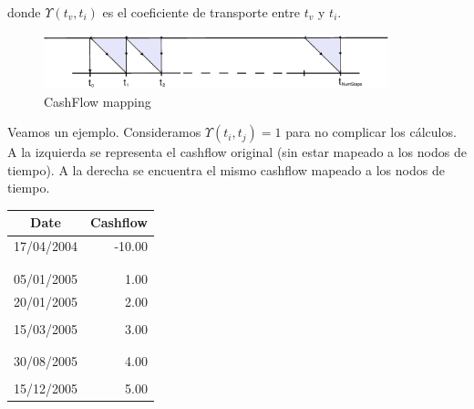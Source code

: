 donde $\Upsilon(t_v,t_i)$ es el coeficiente de transporte entre $t_v$ y $t_i$.

\begin{figure}[!hb]
\begin{center}
\includegraphics[width=10cm,angle=0]{./images/cashflowmapping.eps}
\caption{CashFlow mapping}
\label{timetranches}
\end{center}
\end{figure}

Veamos un ejemplo. Consideramos $\Upsilon(t_i,t_j)=1$ para no complicar los c\'alculos.
A la izquierda se representa el cashflow original (sin estar mapeado a los nodos de
tiempo). A la derecha se encuentra el mismo cashflow mapeado a los nodos de tiempo.
\newline
\newline
\begin{minipage}[c]{0.5\columnwidth}%
\centering
\begin{tabular}{c|r}
\textbf{Date} & \textbf{Cashflow} \\
\hline
17/04/2004 & -10.00 \\
           &        \\
           &        \\
05/01/2005 &   1.00 \\
20/01/2005 &   2.00 \\
           &        \\
15/03/2005 &   3.00 \\
           &        \\
           &        \\
30/08/2005 &   4.00 \\
           &        \\
15/12/2005 &   5.00 \\
\end{tabular}
\end{minipage}%
